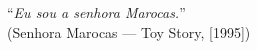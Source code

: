 \begin{epigrafe}
	\vspace*{\fill}
	{%
		\noindent\hspace{.45\textwidth}
		{\begin{minipage}{.5\textwidth}
			``\textit{Eu sou a senhora Marocas.}''\\(Senhora Marocas {---} Toy Story, [1995])
			\end{minipage}}%
		\vspace*{3cm}
	}%
\end{epigrafe}
